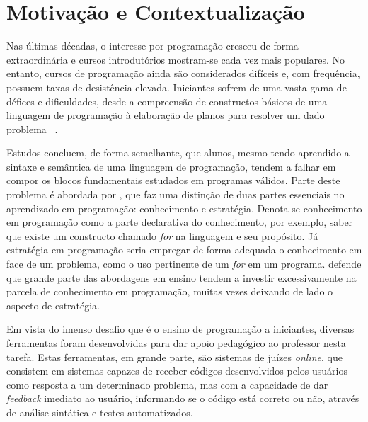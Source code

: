 \section{Motivação e Contextualização}
Nas últimas décadas, o interesse por programação cresceu de forma extraordinária 
e cursos introdutórios mostram-se cada vez mais populares. No entanto, 
cursos de programação ainda são considerados difíceis e, com frequência,
possuem taxas de desistência elevada. Iniciantes sofrem de uma 
vasta gama de défices e dificuldades, desde a compreensão de constructos 
básicos de uma linguagem de programação à elaboração de planos
para resolver um dado problema \ \cite{robins2003learning}.

Estudos concluem, de forma semelhante, que alunos, 
mesmo tendo aprendido a sintaxe e semântica de uma linguagem 
de programação, tendem a falhar em compor os blocos fundamentais 
estudados em programas válidos. Parte deste problema é abordada por 
, que faz uma distinção de duas partes 
essenciais no aprendizado em programação: 
conhecimento e estratégia. Denota-se conhecimento em programação como a parte declarativa 
do conhecimento, por exemplo, saber que existe um constructo chamado \emph{for} na linguagem 
e seu propósito. Já estratégia em programação seria empregar de forma adequada o conhecimento 
em face de um problema, como o uso pertinente de um \emph{for} em um programa.
 defende que grande parte das abordagens em ensino 
tendem a investir excessivamente na parcela de conhecimento em programação, muitas 
vezes deixando de lado o aspecto de estratégia.

Em vista do imenso desafio que é o ensino de programação a iniciantes, diversas ferramentas 
foram desenvolvidas para dar apoio pedagógico ao professor nesta tarefa.  
Estas ferramentas, em grande parte, são sistemas de juízes \emph{online}, 
que consistem em sistemas capazes 
de receber códigos desenvolvidos pelos usuários como resposta a um determinado problema, mas 
com a capacidade de dar \emph{feedback} imediato ao usuário, informando 
se o código está correto ou não, através de análise sintática e testes automatizados.

